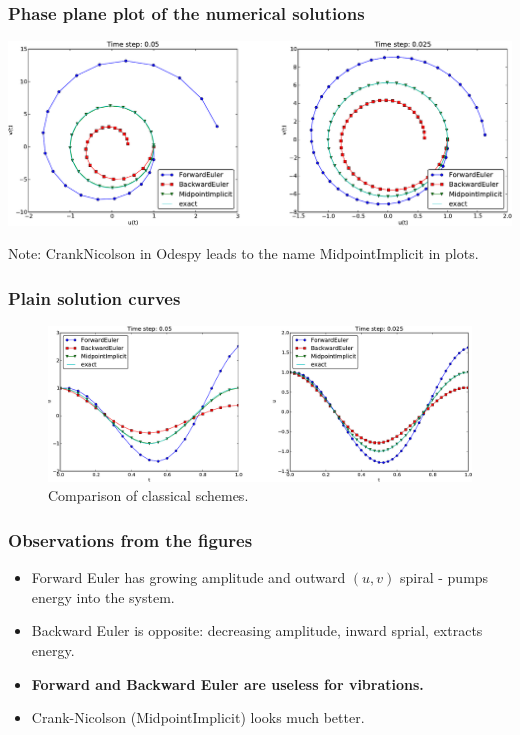 \documentclass{beamer}
\begin{document}
\begin{frame}
\frametitle{Phase plane plot of the numerical solutions}

\centerline{\includegraphics[width=1.0\linewidth]{fig-vib/vib_theta_1_pp.pdf}}



Note: CrankNicolson in Odespy leads to the name MidpointImplicit in plots.
\end{frame}

\begin{frame}
\frametitle{Plain solution curves}

\begin{figure}[!ht]  %
  \centerline{\includegraphics[width=1.0\linewidth]{fig-vib/vib_theta_1_u.pdf}}
  \caption{
  Comparison of classical schemes. \label{vib:model1:1st:odespy:theta}
  }
\end{figure}
\end{frame}

\begin{frame}
\frametitle{Observations from the figures}

\begin{itemize}
  \item Forward Euler has growing amplitude and outward $(u,v)$ spiral - pumps
    energy into the system.

  \item Backward Euler is opposite: decreasing amplitude, inward sprial,
    extracts energy.

  \item \textbf{Forward and Backward Euler are useless for vibrations.}

  \item Crank-Nicolson (MidpointImplicit) looks much better.
\end{itemize}

\noindent
\end{frame}
\end{document}
